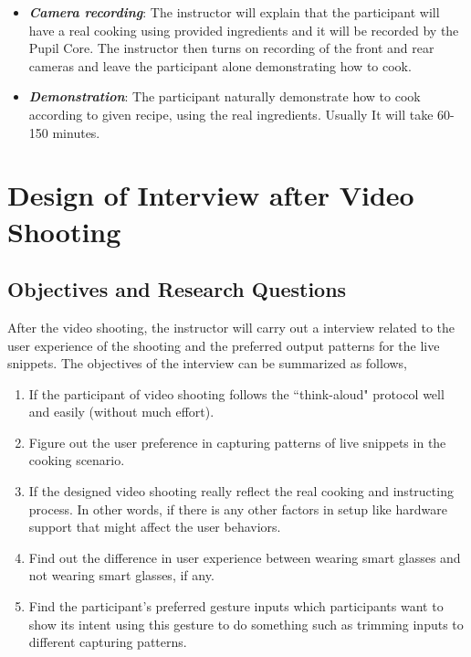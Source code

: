 \documentclass[fyp]{socreport}
\begin{document}
\begin{enumerate}
    \begin{itemize}
        \item \textbf{\textit{Camera recording}}: The instructor will explain that the participant will have a real cooking using provided ingredients and it will be recorded by the Pupil Core. The instructor then turns on recording of the front and rear cameras and leave the participant alone demonstrating how to cook.
        \item \textbf{\textit{Demonstration}}: The participant naturally demonstrate how to cook according to given recipe, using the real ingredients. Usually It will take 60-150 minutes.
    \end{itemize}
\end{enumerate}

\section{Design of Interview after Video Shooting}
\subsection{Objectives and Research Questions}
After the video shooting, the instructor will carry out a interview related to the user experience of the shooting and the preferred output patterns for the live snippets. The objectives of the interview can be summarized as follows,
\begin{enumerate}
    \item If the participant of video shooting follows the ``think-aloud" protocol well and easily (without much effort).
    \item Figure out the user preference in capturing patterns of live snippets in the cooking scenario.
    \item If the designed video shooting really reflect the real cooking and instructing process. In other words, if there is any other factors in setup like hardware support that might affect the user behaviors.
    \item Find out the difference in user experience between wearing smart glasses and not wearing smart glasses, if any.
    \item Find the participant's preferred gesture inputs which participants want to show its intent using this gesture to do something such as trimming inputs to different capturing patterns.
\end{enumerate}
\end{document}
